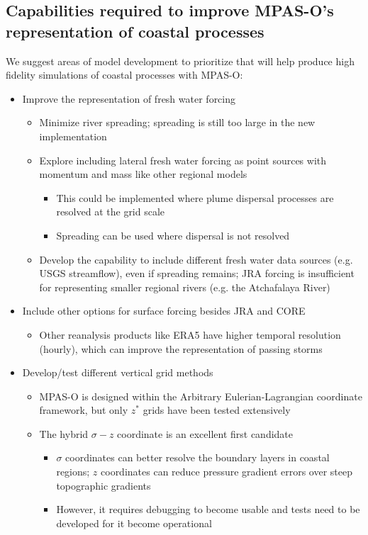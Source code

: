\subsection{Capabilities required to improve MPAS-O's representation of coastal processes}
We suggest areas of model development to prioritize that will help produce high fidelity simulations of coastal processes with MPAS-O: 
\begin{itemize}
    \item Improve the representation of fresh water forcing
    \begin{itemize}
        \item Minimize river spreading; spreading is still too large in the new implementation
        \item Explore including lateral fresh water forcing as point sources with momentum and mass like other regional models 
        \begin{itemize}
            \item This could be implemented where plume dispersal processes are resolved at the grid scale
            \item Spreading can be used where dispersal is not resolved 
        \end{itemize}
        \item Develop the capability to include different fresh water data sources (e.g. USGS streamflow), even if spreading remains; JRA forcing is insufficient for representing smaller regional rivers (e.g. the Atchafalaya River)
    \end{itemize}
    \item Include other options for surface forcing besides JRA and CORE
      \begin{itemize}
        \item Other reanalysis products like ERA5 have higher temporal resolution (hourly), which can improve the representation of passing storms
    \end{itemize}
    \item Develop/test different vertical grid methods
    \begin{itemize}
        \item MPAS-O is designed within the Arbitrary Eulerian-Lagrangian coordinate framework, but only $z^*$ grids have been tested extensively
        \item The hybrid $\sigma-z$ coordinate is an excellent first candidate
        \begin{itemize}
            \item $\sigma$ coordinates can better resolve the boundary layers in coastal regions; $z$ coordinates can reduce pressure gradient errors over steep topographic gradients
            \item However, it requires debugging to become usable and tests need to be developed for it become operational
        \end{itemize}
        

\end{itemize}
\end{itemize}
